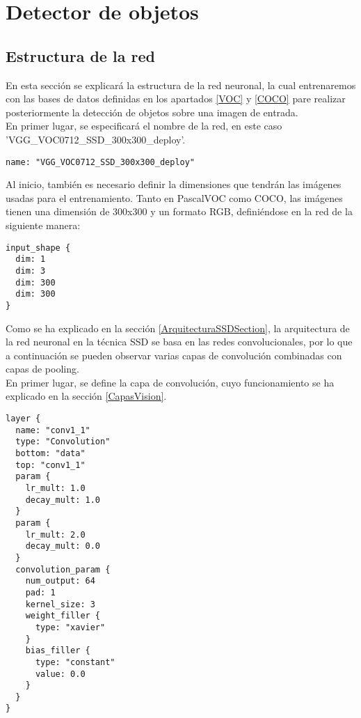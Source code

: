 \documentclass[a4paper, 12pt, oneside]{book}
\begin{document}
\section{Detector de objetos}

\subsection{Estructura de la red}\label{Estructura}

En esta sección se explicará la estructura de la red neuronal, la cual entrenaremos con las bases de datos definidas en los apartados \ref{VOC} y \ref{COCO} pare realizar posteriormente la detección de objetos sobre una imagen de entrada.\\

En primer lugar, se especificará el nombre de la red, en este caso \\'VGG\_VOC0712\_SSD\_300x300\_deploy'.\\

\begin{lstlisting}[frame=single]
name: "VGG_VOC0712_SSD_300x300_deploy"
\end{lstlisting}

Al inicio, también es necesario definir la dimensiones que tendrán las imágenes usadas para el entrenamiento. Tanto en PascalVOC como COCO, las imágenes tienen una dimensión de 300x300 y un formato RGB, definiéndose en la red de la siguiente manera:\\

\begin{lstlisting}[frame=single]
input_shape {
  dim: 1
  dim: 3
  dim: 300
  dim: 300
}
\end{lstlisting}

Como se ha explicado en la sección \ref{ArquitecturaSSDSection}, la arquitectura de la red neuronal en la técnica SSD se basa en las redes convolucionales, por lo que a continuación se pueden observar varias capas de convolución combinadas con capas de pooling.\\

En primer lugar, se define la capa de convolución, cuyo funcionamiento se ha explicado en la sección \ref{CapasVision}.\\

\begin{lstlisting}[frame=single]
layer {
  name: "conv1_1"
  type: "Convolution"
  bottom: "data"
  top: "conv1_1"
  param {
    lr_mult: 1.0
    decay_mult: 1.0
  }
  param {
    lr_mult: 2.0
    decay_mult: 0.0
  }
  convolution_param {
    num_output: 64
    pad: 1
    kernel_size: 3
    weight_filler {
      type: "xavier"
    }
    bias_filler {
      type: "constant"
      value: 0.0
    }
  }
}
\end{lstlisting}
\end{document}
